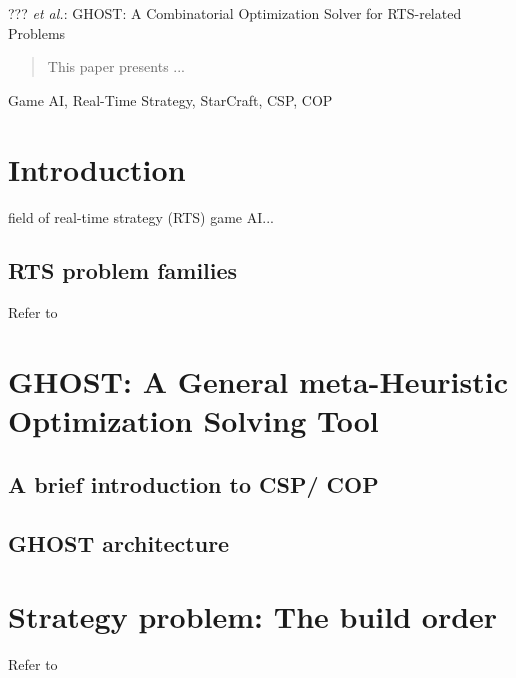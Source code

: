 \documentclass[journal]{IEEEtran}
\newcommand{\csp}{\textsc{CSP}\xspace}
\newcommand{\cop}{\textsc{COP}\xspace}
\newcommand{\ghost}{\textsc{GHOST}\xspace}
\begin{document}
%
{??? \MakeLowercase{\textit{et al.}}: \ghost: A Combinatorial Optimization Solver for RTS-related Problems}

\maketitle

\begin{abstract}
This paper presents ...
\end{abstract}

\begin{IEEEkeywords}
Game AI, Real-Time Strategy, StarCraft, CSP, COP

\end{IEEEkeywords}

%
\IEEEpeerreviewmaketitle

\section{Introduction}\label{sec:intro}
 field of real-time strategy (RTS) game AI...

\subsection{RTS problem families}
Refer to \cite{OntanonSURCM13}


\section{\ghost: A General meta-Heuristic Optimization Solving Tool}\label{sec:ghost}
\subsection{A brief introduction to \csp / \cop}
\subsection{\ghost architecture}

\section{Strategy problem: The build order}\label{sec:bo}
Refer to \cite{ChurchillB11, KuchemPR13, WeberM09, ChoKC13, Blackford14} 
\end{document}
